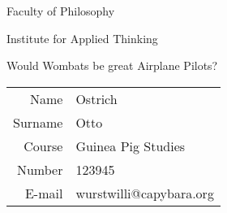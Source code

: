 \documentclass{article}
\begin{document}
\begin{titlepage}
\setlength{\parindent}{0pt}
\Large
Faculty of Philosophy\par 
Institute for Applied Thinking\par 
\vfill
\begin{center}
	Would Wombats be great Airplane Pilots?
\vfill
\vfill
	\begin{tabular}{r@{~:~}l}
Name& Ostrich\\
Surname& Otto \\
Course& Guinea Pig Studies\\ 
Number& 123945\\
E-mail& wurstwilli@capybara.org\\
\end{tabular}
\end{center}
\end{titlepage}
\end{document}

